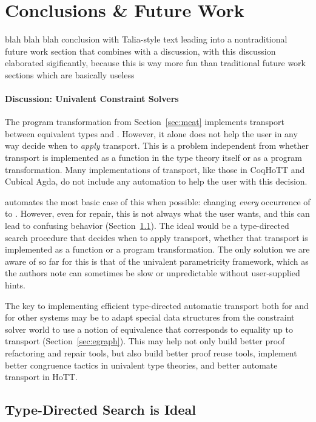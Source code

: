 \section{Conclusions \& Future Work}
\label{sec:discussion}

blah blah blah conclusion with Talia-style text leading into a nontraditional future work section
that combines with a discussion, with this discussion elaborated sigificantly, because this is way more fun
than traditional future work sections which are basically useless

\paragraph{Discussion: Univalent Constraint Solvers}

The program transformation from Section~\ref{sec:meat} implements transport between equivalent types \A and \B.
However, it alone does not help the user in any way decide when to \textit{apply} transport.
This is a problem independent from whether transport is implemented as a function in the type theory itself
or as a program transformation.
Many implementations of transport, like those in CoqHoTT and Cubical Agda, %
do not include any automation to help the user with this decision.

\toolname automates the most basic case of this when possible: changing \textit{every} occurrence of \A to \B.
However, even for repair, this is not always what the user wants, and this can lead to confusing behavior (Section~\ref{sec:ideal}).
The ideal would be a type-directed search procedure that decides when to apply transport,
whether that transport is implemented as a function or a program transformation.
The only solution we are aware of so far for this is that of the univalent parametricity framework,
which as the authors note can sometimes be slow or unpredictable without user-supplied hints.

The key to implementing efficient type-directed automatic transport both for \toolname
and for other systems may be to adapt special data structures from the constraint solver world to use a
notion of equivalence that corresponds to equality up to transport (Section~\ref{sec:egraph}).
This may help not only build better proof refactoring and repair tools, but also build better proof reuse tools,
implement better congruence tactics in univalent type theories, and better automate transport in HoTT.

\subsection{Type-Directed Search is Ideal}
\label{sec:ideal}

